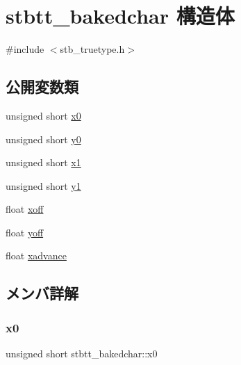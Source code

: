 \hypertarget{structstbtt__bakedchar}{}\section{stbtt\+\_\+bakedchar 構造体}
\label{structstbtt__bakedchar}


{\ttfamily \#include $<$stb\+\_\+truetype.\+h$>$}

\subsection*{公開変数類}
\begin{DoxyCompactItemize}
\item 
unsigned short \mbox{\hyperlink{structstbtt__bakedchar_a8011a0ed0410de9fa405c9cb1ab43da2}{x0}}
\item 
unsigned short \mbox{\hyperlink{structstbtt__bakedchar_aec4def12c086e0038ba32ff33ee78644}{y0}}
\item 
unsigned short \mbox{\hyperlink{structstbtt__bakedchar_a72c22c32abde95a5ba02925b8bd892bf}{x1}}
\item 
unsigned short \mbox{\hyperlink{structstbtt__bakedchar_ac831dc667f6c39b5d22740c6cbd5bc3f}{y1}}
\item 
float \mbox{\hyperlink{structstbtt__bakedchar_a0708a6588a2768b68a3ae59002944b7c}{xoff}}
\item 
float \mbox{\hyperlink{structstbtt__bakedchar_aba01393e52d1c6f4ce86a8b51e498bb4}{yoff}}
\item 
float \mbox{\hyperlink{structstbtt__bakedchar_ad77b35d1a849d9eb7edb91df05b10536}{xadvance}}
\end{DoxyCompactItemize}


\subsection{メンバ詳解}
\mbox{\label{structstbtt__bakedchar_a8011a0ed0410de9fa405c9cb1ab43da2}} 
\subsubsection{\texorpdfstring{x0}{x0}}
{\footnotesize\ttfamily unsigned short stbtt\+\_\+bakedchar\+::x0}

\mbox{\label{structstbtt__bakedchar_a72c22c32abde95a5ba02925b8bd892bf}} 
